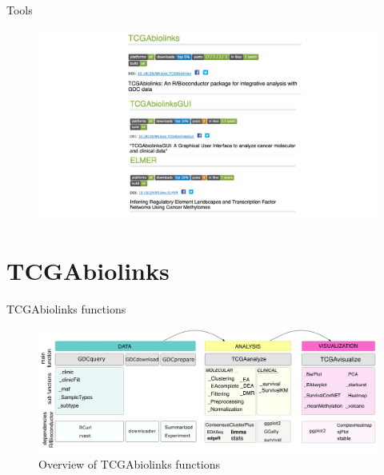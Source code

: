 \documentclass[slidestop,compress,11pt,xcolor=dvipsnames]{beamer}
\begin{document}
\begin{frame}[plain]{Tools}
\vspace*{-0.4cm}
\begin{figure}
 \centering
 \includegraphics[width=0.75\linewidth]{intro/tools.pdf}
\end{figure}
\end{frame}

\section{TCGAbiolinks}

\begin{frame}{TCGAbiolinks functions}
 \begin{figure}
  \centering
  \includegraphics[width=1.0\linewidth]{TCGAbiolinks/summary.pdf}
  \caption{Overview of TCGAbiolinks functions}
 \end{figure}
\end{frame}
\end{document}
